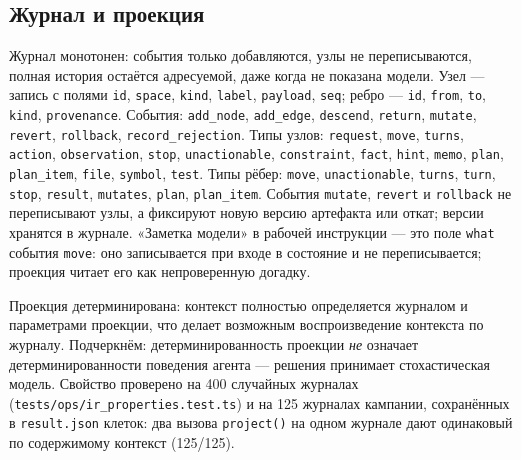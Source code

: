 \documentclass[11pt,a4paper]{article}
\begin{document}
\subsection{Журнал и проекция}

Журнал монотонен: события только добавляются, узлы не переписываются, полная история
остаётся адресуемой, даже когда не показана модели. Узел --- запись с полями \texttt{id},
\texttt{space}, \texttt{kind}, \texttt{label}, \texttt{payload}, \texttt{seq}; ребро ---
\texttt{id}, \texttt{from}, \texttt{to}, \texttt{kind}, \texttt{provenance}. События:
\texttt{add\_node}, \texttt{add\_edge}, \texttt{descend}, \texttt{return},
\texttt{mutate}, \texttt{revert}, \texttt{rollback}, \texttt{record\_rejection}. Типы
узлов: \texttt{request}, \texttt{move}, \texttt{turns}, \texttt{action},
\texttt{observation}, \texttt{stop}, \texttt{unactionable}, \texttt{constraint},
\texttt{fact}, \texttt{hint}, \texttt{memo}, \texttt{plan}, \texttt{plan\_item},
\texttt{file}, \texttt{symbol}, \texttt{test}. Типы рёбер: \texttt{move},
\texttt{unactionable}, \texttt{turns}, \texttt{turn}, \texttt{stop}, \texttt{result},
\texttt{mutates}, \texttt{plan}, \texttt{plan\_item}. События \texttt{mutate},
\texttt{revert} и \texttt{rollback} не переписывают узлы, а фиксируют новую версию
артефакта или откат; версии хранятся в журнале. «Заметка модели» в рабочей инструкции ---
это поле \texttt{what} события \texttt{move}: оно записывается при входе в состояние и не
переписывается; проекция читает его как непроверенную догадку.

Проекция детерминирована: контекст полностью определяется журналом и параметрами
проекции, что делает возможным воспроизведение контекста по журналу. Подчеркнём:
детерминированность проекции \emph{не} означает детерминированности поведения агента ---
решения принимает стохастическая модель. Свойство проверено на 400 случайных журналах
(\texttt{tests/ops/ir\_properties.test.ts}) и на 125 журналах кампании, сохранённых в
\texttt{result.json} клеток: два вызова \texttt{project()} на одном журнале дают одинаковый
по содержимому контекст (125/125).
\end{document}
